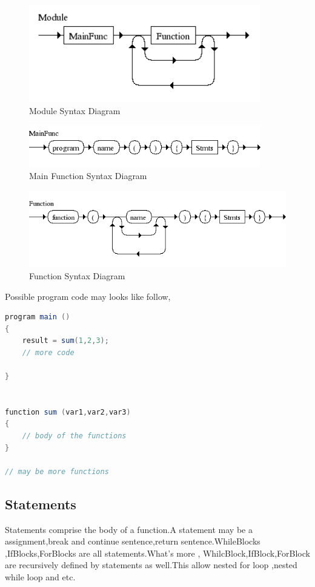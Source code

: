 \begin{figure}[H]
  \centering
	\includegraphics[width=0.90\textwidth]{pic/c4/module.png}
	\caption{Module Syntax Diagram}
\end{figure}

\begin{figure}[H]
  \centering
	\includegraphics[width=0.90\textwidth]{pic/c4/main_function.png}
	\caption{Main Function Syntax Diagram}
\end{figure}

\begin{figure}[H]
  \centering
	\includegraphics[width=1.00\textwidth]{pic/c4/function.png}
	\caption{Function Syntax Diagram}
\end{figure}


Possible program code may looks like follow,

\begin{lstlisting}[language=java]
program main ()
{
 	result = sum(1,2,3);
 	// more code
 	
}


function sum (var1,var2,var3)
{
	// body of the functions
}

// may be more functions
\end{lstlisting}


\subsection{Statements}
Statements  comprise the body of a function.A statement may be a assignment,break and continue sentence,return sentence.WhileBlocks ,IfBlocks,ForBlocks are all statements.What's more , WhilcBlock,IfBlock,ForBlock are recursively defined by statements as well.This allow nested for loop ,nested while loop and etc.

